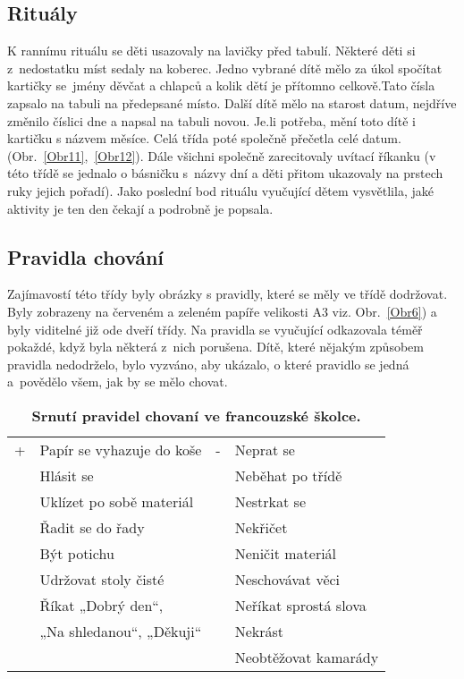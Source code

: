 		\subsection{Rituály}
		\label{ritualy}
			K rannímu rituálu se děti usazovaly na lavičky před tabulí. Některé děti si z nedostatku míst sedaly na koberec. Jedno vybrané dítě mělo za úkol spočítat kartičky se jmény děvčat a chlapců a kolik dětí je přítomno celkově.Tato čísla zapsalo na tabuli na předepsané místo. Další dítě mělo na starost datum, nejdříve změnilo číslici dne a napsal na tabuli novou. Je.li potřeba, mění toto dítě i kartičku s názvem měsíce. Celá třída poté společně přečetla celé datum. (Obr.~\ref{Obr11},~\ref{Obr12}). Dále všichni společně zarecitovaly uvítací říkanku (v této třídě se jednalo o básničku s názvy dní a děti přitom ukazovaly na prstech ruky jejich pořadí). Jako poslední bod rituálu vyučující dětem vysvětlila, jaké aktivity je ten den čekají a podrobně je popsala. 

		\subsection{Pravidla chování}
		\label{pravidlaChovani}
			Zajímavostí této třídy byly obrázky s pravidly, které se měly ve třídě dodržovat. Byly zobrazeny na červeném a zeleném papíře velikosti A3 viz. Obr.~\ref{Obr6}) a byly viditelné již ode dveří třídy. Na pravidla se vyučující odkazovala téměř pokaždé, když byla některá z nich porušena. Dítě, které nějakým způsobem pravidla nedodrželo, bylo vyzváno, aby ukázalo, o které pravidlo se jedná a povědělo všem, jak by se mělo chovat. 

			\begin{spacing}{1.0}
			\begin{table}[h!]
				\center
				\begin{tabular}{|ll|ll|}
					\hline
					\rowcolor{grey!0}
				+	& Papír se vyhazuje do koše						& -	& Neprat se 			\\
					& Hlásit se 									&  	& Neběhat po třídě		\\
					& Uklízet po sobě materiál 						&	& Nestrkat se 			\\
					& Řadit se do řady 								&	& Nekřičet 				\\
					& Být potichu 									& 	& Neničit materiál 		\\
					& Udržovat stoly čisté 							& 	& Neschovávat věci 		\\
					& Říkat „Dobrý den“,							&	& Neříkat sprostá slova \\
					&  „Na shledanou“, „Děkuji“						&	& Nekrást				\\
					&												&	& Neobtěžovat kamarády 	\\
					\hline
				\end{tabular}
				\caption{ \textbf{Srnutí pravidel chovaní ve francouzské školce.}}
			\label{tab:pravidlaFR}
			\end{table}
			\end{spacing}

